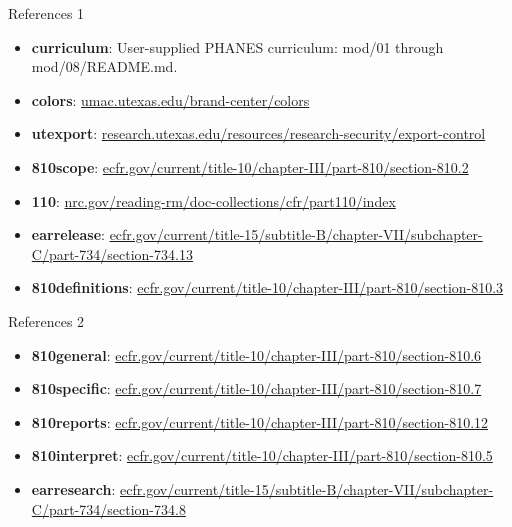 \documentclass[aspectratio=169,11pt]{beamer}
\begin{document}
\begin{frame}[t]{References 1}
\fontsize{9}{12}\selectfont\begin{itemize}\setlength{\itemsep}{3mm}
\item \textbf{curriculum}: User-supplied PHANES curriculum: mod/01 through mod/08/README.md.
\item \textbf{colors}: \href{https://umac.utexas.edu/brand-center/colors/}{umac.utexas.edu/brand-center/colors}
\item \textbf{utexport}: \href{https://research.utexas.edu/resources/research-security/export-control}{research.utexas.edu/resources/research-security/export-control}
\item \textbf{810scope}: \href{https://www.ecfr.gov/current/title-10/chapter-III/part-810/section-810.2}{ecfr.gov/current/title-10/chapter-III/part-810/section-810.2}
\item \textbf{110}: \href{https://www.nrc.gov/reading-rm/doc-collections/cfr/part110/index}{nrc.gov/reading-rm/doc-collections/cfr/part110/index}
\item \textbf{earrelease}: \href{https://www.ecfr.gov/current/title-15/subtitle-B/chapter-VII/subchapter-C/part-734/section-734.13}{ecfr.gov/current/title-15/subtitle-B/chapter-VII/subchapter-C/part-734/section-734.13}
\item \textbf{810definitions}: \href{https://www.ecfr.gov/current/title-10/chapter-III/part-810/section-810.3}{ecfr.gov/current/title-10/chapter-III/part-810/section-810.3}
\end{itemize}\end{frame}
\begin{frame}[t]{References 2}
\fontsize{9}{12}\selectfont\begin{itemize}\setlength{\itemsep}{3mm}
\item \textbf{810general}: \href{https://www.ecfr.gov/current/title-10/chapter-III/part-810/section-810.6}{ecfr.gov/current/title-10/chapter-III/part-810/section-810.6}
\item \textbf{810specific}: \href{https://www.ecfr.gov/current/title-10/chapter-III/part-810/section-810.7}{ecfr.gov/current/title-10/chapter-III/part-810/section-810.7}
\item \textbf{810reports}: \href{https://www.ecfr.gov/current/title-10/chapter-III/part-810/section-810.12}{ecfr.gov/current/title-10/chapter-III/part-810/section-810.12}
\item \textbf{810interpret}: \href{https://www.ecfr.gov/current/title-10/chapter-III/part-810/section-810.5}{ecfr.gov/current/title-10/chapter-III/part-810/section-810.5}
\item \textbf{earresearch}: \href{https://www.ecfr.gov/current/title-15/subtitle-B/chapter-VII/subchapter-C/part-734/section-734.8}{ecfr.gov/current/title-15/subtitle-B/chapter-VII/subchapter-C/part-734/section-734.8}
\end{itemize}\end{frame}
\end{document}
